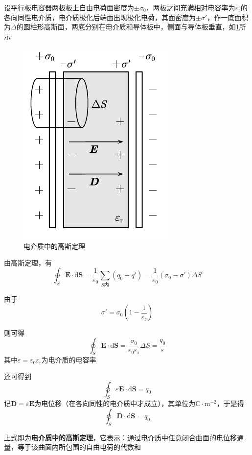 \documentclass[12pt, a4paper, twoside]{ctexbook}
\begin{document}
设平行板电容器两极板上自由电荷面密度为$\pm\sigma_0$，两板之间充满相对电容率为$\varepsilon_{\mathrm{r}}$的各向同性电介质，电介质极化后端面出现极化电荷，其面密度为$\pm\sigma'$，作一底面积为$\Delta$的圆柱形高斯面，两底分别在电介质和导体板中，侧面与导体板垂直，如\textcolor{blue}{\cref{fig:电介质中的高斯定理}}所示
\begin{figure}[H]
    \centerline{\includegraphics[scale=1.0]{电介质中的高斯定理.pdf}}
    \caption{电介质中的高斯定理}\label{fig:电介质中的高斯定理}
\end{figure}
由高斯定理，有
$$
\oint_S \boldsymbol{E}\cdot\mathrm{d}\boldsymbol{S}=\frac{1}{\varepsilon_0}\sum_{S\text{内}}\left(q_0+q'\right)=\frac{1}{\varepsilon_0}\left(\sigma_0-\sigma'\right)\Delta S
$$

由于
$$
\sigma'=\sigma_0\left(1-\frac{1}{\varepsilon_{\mathrm{r}}}\right)
$$

则可得
$$
\oint_S \boldsymbol{E}\cdot\mathrm{d}\boldsymbol{S}=\frac{\sigma_0}{\varepsilon_0\varepsilon_{\mathrm{r}}}\Delta S=\frac{q_0}{\varepsilon}
$$
其中$\varepsilon=\varepsilon_0\varepsilon_{\mathrm{r}}$为电介质的电容率

还可得到
$$
\oint_S \varepsilon\boldsymbol{E}\cdot\mathrm{d}\boldsymbol{S}=q_0
$$
记$\boldsymbol{D}=\varepsilon\boldsymbol{E}$为电位移（在各向同性的电介质中才成立），其单位为$\mathrm{C}\cdot\mathrm{m}^{-2}$，于是得
$$
\oint_S \boldsymbol{D}\cdot\mathrm{d}\boldsymbol{S}=q_0
$$

上式即为\textbf{电介质中的高斯定理}，它表示：通过电介质中任意闭合曲面的电位移通量，等于该曲面内所包围的自由电荷的代数和
\end{document}

